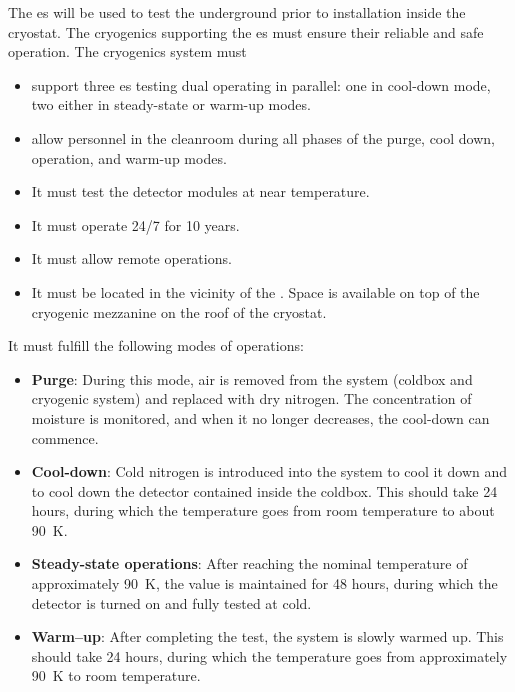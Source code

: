 \label{sec:fdsp-tc-cryocoldbox}

The  \coldbox{}es will be used to test the  underground prior to installation inside the cryostat. The cryogenics supporting the \coldbox{}es  must ensure their reliable and safe operation. The  \coldbox cryogenics system must
\begin{itemize}
\setlength\itemsep{1mm}
\setlength{\parsep}{1mm}
\setlength{\itemsep}{-5mm}
\item support three \coldbox{}es testing dual  operating in parallel: one in cool-down mode, two either in steady-state or warm-up modes.
\item allow personnel in the cleanroom during all phases of the purge, cool down, operation, and warm-up modes. 
\item It must test the detector modules at near  temperature.
\item It must operate 24/7 for 10 years.
\item It must allow remote operations.
\item It must be located in the vicinity of the . Space is available on top of the cryogenic mezzanine on the roof of the cryostat.
\end{itemize}

It must fulfill the following modes of operations:

\begin{itemize}
\setlength\itemsep{1mm}
\setlength{\parsep}{1mm}
\setlength{\itemsep}{-5mm}
\item \textbf{Purge}: During this mode, air is removed from the system (coldbox and cryogenic system) and replaced with dry nitrogen. The concentration of moisture is monitored, and when it no longer decreases, the cool-down can commence.
\item \textbf{Cool-down}: Cold nitrogen is introduced into the system to cool it down and to cool down the detector contained inside the coldbox. This should take 24 hours, during which the temperature goes from room temperature to about \SI{90}{K}. 
\item \textbf{Steady-state operations}: After reaching the nominal temperature of approximately \SI{90}{K}, the value is maintained for 48 hours, during which the detector is turned on and fully tested at cold. 
\item \textbf{Warm--up}: After completing the test, the system is slowly warmed up. This should take 24 hours, during which the temperature goes from approximately \SI{90}{K} to room temperature.
\end{itemize}

